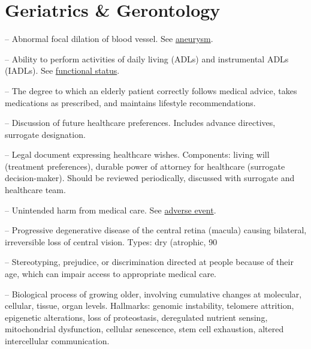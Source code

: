 \chapter{Geriatrics \& Gerontology}

-- Abnormal focal dilation of blood vessel. See \hyperlink{Aneurysm}{aneurysm}.

-- Ability to perform activities of daily living (ADLs) and instrumental ADLs (IADLs). See \hyperlink{Functional Status}{functional status}.

-- The degree to which an elderly patient correctly follows medical advice, takes medications as prescribed, and maintains lifestyle recommendations.

-- Discussion of future healthcare preferences. Includes advance directives, surrogate designation.

-- Legal document expressing healthcare wishes. Components: living will (treatment preferences), durable power of attorney for healthcare (surrogate decision-maker). Should be reviewed periodically, discussed with surrogate and healthcare team.

-- Unintended harm from medical care. See \hyperlink{Adverse Event}{adverse event}.

-- Progressive degenerative disease of the central retina (macula) causing bilateral, irreversible loss of central vision. Types: dry (atrophic, 90%

-- Stereotyping, prejudice, or discrimination directed at people because of their age, which can impair access to appropriate medical care.


-- Biological process of growing older, involving cumulative changes at molecular, cellular, tissue, organ levels. Hallmarks: genomic instability, telomere attrition, epigenetic alterations, loss of proteostasis, deregulated nutrient sensing, mitochondrial dysfunction, cellular senescence, stem cell exhaustion, altered intercellular communication.

